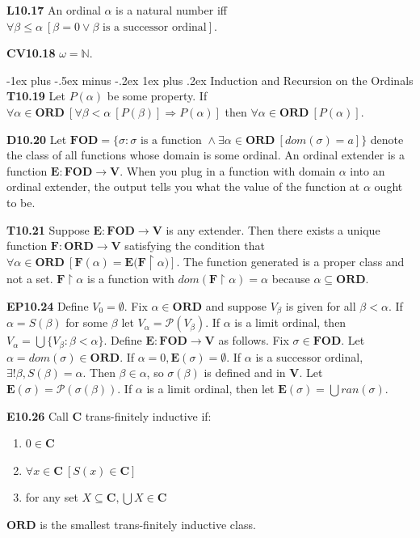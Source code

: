 \documentclass[10pt, landscape]{article}
\makeatletter
\renewcommand{\subsection}{\@startsection{subsection}{3}{0mm}%
                                {-1ex plus -.5ex minus -.2ex}%
                                {1ex plus .2ex}%
                                {\normalfont\small\bfseries}}%
\makeatother
\begin{document}
\begin{multicols*}{3}
\textbf{L10.17} An ordinal $\alpha$ is a natural number iff $\forall \beta \leq \alpha \ [\beta=0\lor \beta \text{ is a successor ordinal}]$.

\textbf{CV10.18} $\omega=\mathbb{N}$.

\subsection{Induction and Recursion on the Ordinals}
\textbf{T10.19} Let $P(\alpha)$ be some property. If $\forall \alpha \in \mathbf{ORD}\ [\forall \beta < \alpha\ [P(\beta)] \Longrightarrow P(\alpha)]$ then $\forall \alpha \in \mathbf{ORD}\ [P(\alpha)]$.

\textbf{D10.20} Let $\mathbf{FOD}=\{\sigma:\sigma \text{ is a function }\land \exists \alpha \in \mathbf{ORD} \ [dom(\sigma)=a]\}$ denote the class of all functions whose domain is some ordinal. An ordinal extender is a function $\mathbf{E:FOD\rightarrow V}$. When you plug in a function with domain $\alpha$ into an ordinal extender, the output tells you what the value of the function at $\alpha$ ought to be.

\textbf{T10.21} Suppose $\mathbf{E:FOD\rightarrow V}$ is any extender. Then there exists a unique function $\mathbf{F:ORD\rightarrow V}$ satisfying the condition that $\forall \alpha \in \mathbf{ORD}\ [\mathbf{F}(\alpha)=\mathbf{E(F}\restriction\alpha)]$. The function generated is a proper class and not a set. $\mathbf{F}\restriction\alpha$ is a function with $dom(\mathbf{F}\restriction\alpha)=\alpha$ because $\alpha \subseteq \mathbf{ORD}$.

\textbf{EP10.24} Define $V_0=\emptyset$. Fix $\alpha \in \mathbf{ORD}$ and suppose $V_\beta$ is given for all $\beta<\alpha$. If $\alpha=S(\beta)$ for some $\beta$ let $V_\alpha=\mathcal{P}(V_\beta)$. If $\alpha$ is a limit ordinal, then $V_\alpha=\bigcup\{V_\beta:\beta<\alpha\}$. Define $\mathbf{E:FOD\rightarrow V}$ as follows. Fix $\sigma\in \mathbf{FOD}$. Let $\alpha=dom(\sigma)\in \mathbf{ORD}$. If $\alpha=0, \mathbf{E}(\sigma)=\emptyset$. If $\alpha$ is a successor ordinal, $\exists! \beta, S(\beta)=\alpha$. Then $\beta\in\alpha$, so $\sigma(\beta)$ is defined and in $\mathbf{V}$. Let $\mathbf{E}(\sigma)=\mathcal{P}(\sigma(\beta))$. If $\alpha$ is a limit ordinal, then let $\mathbf{E}(\sigma)=\bigcup ran(\sigma)$.

\textbf{E10.26} Call $\mathbf{C}$ trans-finitely inductive if:
\begin{enumerate}
    \item $0\in \mathbf{C}$
    \item $\forall x \in \mathbf{C} \ [S(x) \in \mathbf{C}]$
    \item for any set $X \subseteq \mathbf{C}, \bigcup X \in \mathbf{C}$
\end{enumerate} $\mathbf{ORD}$ is the smallest trans-finitely inductive class.


\end{multicols*}
\end{document}
